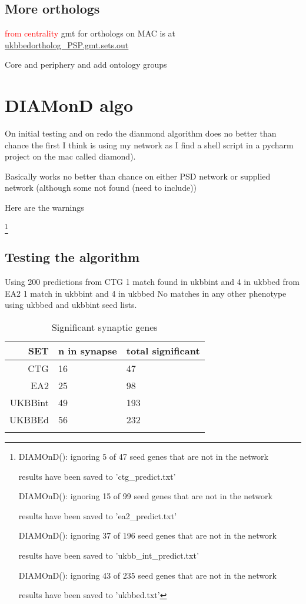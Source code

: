 \subsection{More orthologs}
\textcolor{red}{from centrality}
gmt for orthologs on MAC is at \url{ukbbedortholog_PSP.gmt.sets.out }

Core and periphery
and add ontology groups



\section{DIAMonD algo}
\label{sec:DIAMOnD algo}
On initial testing and on redo the dianmond algorithm does no better than chance the first I think is using my network as I find a shell script in a pycharm project on the mac called diamond).

Basically works no better than chance on either PSD network or supplied network (although some not found (need to include))

Here are the warnings

\footnote{DIAMOnD(): ignoring 5 of 47 seed genes that are not in the network

 results have been saved to 'ctg\_predict.txt' 

DIAMOnD(): ignoring 15 of 99 seed genes that are not in the network

 results have been saved to 'ea2\_predict.txt' 

DIAMOnD(): ignoring 37 of 196 seed genes that are not in the network

 results have been saved to 'ukbb\_int\_predict.txt' 

DIAMOnD(): ignoring 43 of 235 seed genes that are not in the network

 results have been saved to 'ukbbed.txt' }

\subsection{Testing the algorithm}
 Using 200 predictions from CTG 1 match found in ukbbint and 4 in ukbbed
 from EA2 1 match in ukbbint and 4 in ukbbed
 No matches in any other phenotype using ukbbed and ukbbint seed lists.
 \begin{table}[ht]
\centering
\begin{tabular}{rll}
  \hline
  SET & n in synapse & total significant\\ 
  \hline
 CTG & 16 &47\\
 EA2 & 25 & 98\\
 UKBBint & 49 & 193\\
  UKBBEd & 56 & 232\\
  \\ 
 
   \hline
\end{tabular}
\caption{Significant synaptic genes}
\label{table:MAGMA_Gene_result_significant synaptic genes}
\end{table}


